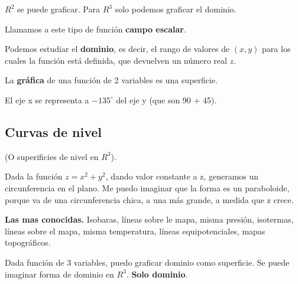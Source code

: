 \(R^{2}\) se puede graficar.
Para \(R^{3}\) solo podemos graficar el dominio.

Llamamos a este tipo de función \textbf{campo escalar}.

Podemos estudiar el \textbf{dominio},
es decir, 
el rango de valores de \((x,y)\) para los cuales la función está definida,
que devuelven un número real \(z\).

La \textbf{gráfica} de una función de 2 variables
es una superficie.

El eje x se representa a \(-135^{\circ}\) del eje y
(que son 90 + 45).

\subsection{Curvas de nivel}

(O superificies de nivel en \(R^{3}\)).

Dada la función \(z=x^{2}+y^{2}\),
dando valor constante a z,
generamos un circunferencia en el plano.
Me puedo imaginar que la forma es un paraboloide,
porque va de una circunferencia chica,
a una más grande,
a medida que z crece.

\textbf{Las mas conocidas.}
Isobaras, líneas sobre le mapa, misma presión,
isotermas, líneas sobre el mapa, misma temperatura,
líneas equipotenciales,
mapas topográficos.

Dada función de 3 variables,
puedo graficar dominio como superficie.
Se puede imaginar forma de dominio en \(R^{3}\).
\textbf{Solo dominio}.
